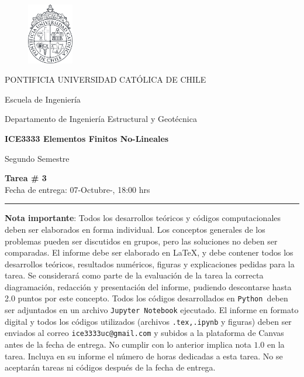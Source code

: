 \documentclass[11pt,letterpaper]{article}
\def\python{\mbox{\tt Python}}
\def\python{\mbox{\tt Python }}
\begin{document}
\begin{minipage}[t]{.14\textwidth}
	\vspace{-0.8cm}
	\begin{figure}[H]
	\centering
	\includegraphics[width=2cm]{LogoUC-BN.pdf}
	\end{figure}
\end{minipage}
\hfill
\begin{minipage}[t]{.85\textwidth}
\vspace{0.05cm}
	\begin{flushleft}
	PONTIFICIA UNIVERSIDAD CAT\'OLICA DE CHILE
	
	Escuela de Ingenier\'ia
	
	Departamento de Ingenier\'ia Estructural y Geot\'ecnica
	
	\textbf{ICE3333 Elementos Finitos No-Lineales}
	
	Segundo Semestre \the\year
	\end{flushleft}
\end{minipage}

\vspace{-10pt}
\begin{center}
\large
{\bf Tarea \# 3}\\
Fecha de entrega: 07-Octubre-\the\year, 18:00 hrs
\rule{\linewidth}{0.4mm}

\end{center}

\vspace{-8pt}
\textbf{Nota importante}: Todos los desarrollos te\'oricos y c\'odigos computacionales deben ser elaborados en forma individual. Los conceptos generales de los problemas pueden ser discutidos en grupos, pero las soluciones no deben ser comparadas. El informe debe ser elaborado en \LaTeX, y debe contener todos los desarrollos te\'oricos, resultados num\'ericos, figuras y explicaciones pedidas para la tarea. Se considerar\'a como parte de la evaluaci\'on de la tarea la correcta diagramaci\'on, redacci\'on y presentaci\'on del informe, pudiendo descontarse hasta 2.0 puntos por este concepto. Todos los c\'odigos desarrollados en \python deben ser adjuntados en un archivo {\tt Jupyter Notebook} ejecutado. El informe en formato digital y todos los c\'odigos utilizados (archivos {\tt .tex,.ipynb} y figuras) deben ser enviados al correo {\tt ice3333uc@gmail.com} y subidos a la plataforma de
Canvas antes de la fecha de entrega. No cumplir con lo anterior implica nota $1.0$ en la tarea. Incluya en su informe el n\'umero de horas dedicadas a esta tarea. No se aceptar\'an tareas ni c\'odigos despu\'es de la fecha de entrega.
\end{document}
